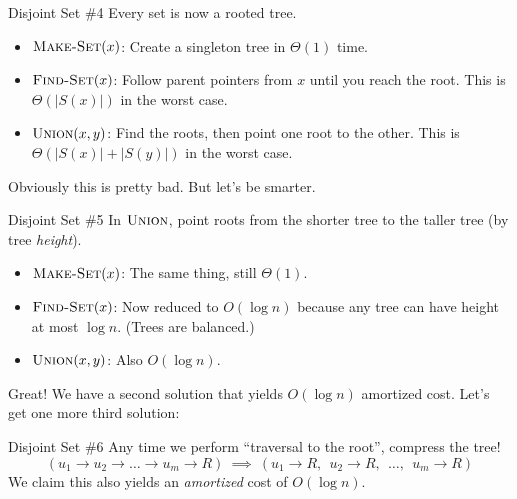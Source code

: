 \begin{solution}{Disjoint Set \#4}
    Every set is now a rooted tree.
    \begin{itemize}
        \item $\textsc{Make-Set}(x)$: Create a singleton tree in $\Theta(1)$ time.
        \item $\textsc{Find-Set}(x)$: Follow parent pointers from $x$ until you reach the root.  This is $\Theta(|S(x)|)$ in the worst case.
        \item $\textsc{Union}(x, y)$: Find the roots, then point one root to the other.  This is $\Theta(|S(x)| + |S(y)|)$ in the worst case.
    \end{itemize}
\end{solution}
Obviously this is pretty bad.  But let's be smarter.

\begin{solution}{Disjoint Set \#5}
    In $\textsc{Union}$, point roots from the shorter tree to the taller tree (by tree \emph{height}).
    \begin{itemize}
        \item $\textsc{Make-Set}(x)$: The same thing, still $\Theta(1)$.
        \item $\textsc{Find-Set}(x)$: Now reduced to $O(\log n)$ because any tree can have height at most $\log n$.  (Trees are balanced.)
        \item $\textsc{Union}(x, y)$: Also $O(\log n)$.
    \end{itemize}
\end{solution}
Great!  We have a second solution that yields $O(\log n)$ amortized cost.  Let's get one more third solution:

\begin{solution}{Disjoint Set \#6}
    Any time we perform ``traversal to the root'', compress the tree!
    \[ (u_1 \to u_2 \to \dots \to u_m \to R) ~ \implies ~ (u_1 \to R, ~~ u_2 \to R, ~~ \dots, ~~ u_m \to R) \]
    We claim this also yields an \emph{amortized} cost of $O(\log n)$.
\end{solution}

